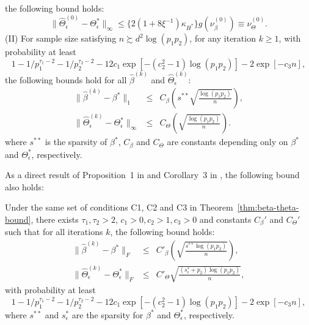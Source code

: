 \begin{theorem}
the following bound holds:
\begin{equation}\label{eqn:Theta0bound}
\|\widehat{\Theta}^{(0)}_\epsilon - \Theta^*_\epsilon\|_\infty \leq \{2(1+8\xi^{-1})\kappa_{H^*}\}g({\nu_\beta^{(0)}}) \equiv \nu_\Theta^{(0)}.
\end{equation}
(II) For sample size satisfying $n \succsim d^2\log(p_1p_2) $, for any iteration $k\geq 1$, with probability at least 
\begin{equation*}
1-1/p_1^{\tau_1-2} - 1/p_2^{\tau_2-2} - 12c_1\exp[-(c_2^2-1)\log (p_1p_2)] - 2\exp[-c_3n], 
\end{equation*}
the following bounds hold for all $\widehat{\beta}^{(k)}$ and $\widehat{\Theta}^{(k)}_\epsilon$: 
\begin{eqnarray*}
\|\widehat{\beta}^{(k)} - \beta^*\|_1 &\leq & C_\beta\left( s^{**}\sqrt{\frac{\log(p_1p_2)}{n}}\right),\\
\|\widehat{\Theta}^{(k)}_\epsilon - \Theta^*_\epsilon\|_\infty &\leq& C_\Theta\left(\sqrt{\frac{\log(p_1p_2)}{n}}\right).
\end{eqnarray*}
where $s^{**}$ is the sparsity of $\beta^*$, $C_\beta$ and $C_\Theta$ are constants depending only on $\beta^*$ and $\Theta_\epsilon^*$, respectively.
\end{theorem}

\medskip
As a direct result of Proposition~1 in \citet{basu2015estimation} and Corollary~3 in \citet{ravikumar2011high}, the following bound also holds:
\begin{corollary}\label{cor:beta-theta-bound}
Under the same set of conditions C1, C2 and C3 in Theorem~\ref{thm:beta-theta-bound}, there exists $\tau_1,\tau_2>2$, $c_1>0,c_2>1,c_3>0$ and constants $C_\beta'$ and $C_\Theta'$ such that for all iterations $k$, the following bound holds:
\begin{eqnarray*}
\|\widehat{\beta}^{(k)} - \beta^*\|_F &\leq & C'_\beta\left( \sqrt{\frac{s^{**}\log(p_1p_2)}{n}}\right),\\
\|\widehat{\Theta}^{(k)}_\epsilon - \Theta^*_\epsilon\|_F &\leq& C'_\Theta\sqrt{\frac{(s_\epsilon^*+p_2)\log(p_1p_2)}{n}},
\end{eqnarray*}
with probability at least 
\begin{equation*}
1-1/p_1^{\tau_1-2} - 1/p_2^{\tau_2-2} - 12c_1\exp[-(c_2^2-1)\log (p_1p_2)] - 2\exp[-c_3n],
\end{equation*}
where $s^{**}$ and $s^*_\epsilon$ are the sparsity for $\beta^*$ and $\Theta^*_\epsilon$, respectively.
\end{corollary}

